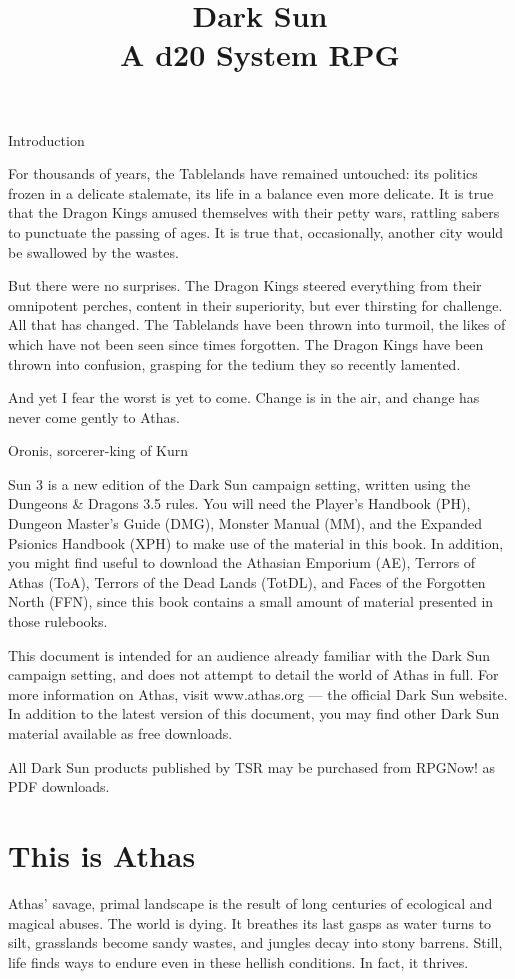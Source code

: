 \documentclass[10pt,a4paper,twocolumn]{d20}
\title{Dark Sun\\
  \large A d20 System RPG}
\begin{document}
\tableofcontents

\Chapter
{Introduction}
{For thousands of years, the Tablelands have remained untouched: its politics frozen in a delicate stalemate, its life in a balance even more delicate. It is true that the Dragon Kings amused themselves with their petty wars, rattling sabers to punctuate the passing of ages. It is true that, occasionally, another city would be swallowed by the wastes.

But there were no surprises. The Dragon Kings steered everything from their omnipotent perches, content in their superiority, but ever thirsting for challenge. All that has changed. The Tablelands have been thrown into turmoil, the likes of which have not been seen since times forgotten. The Dragon Kings have been thrown into confusion, grasping for the tedium they so recently lamented.

And yet I fear the worst is yet to come. Change is in the air, and change has never come gently to Athas.}
{Oronis, sorcerer-king of Kurn}
{}

 Sun 3 is a new edition of the Dark Sun campaign setting, written using the Dungeons \& Dragons 3.5 rules. You will need the Player’s Handbook (PH), Dungeon Master’s Guide (DMG), Monster Manual (MM), and the Expanded Psionics Handbook (XPH) to make use of the material in this book. In addition, you might find useful to download the Athasian Emporium (AE), Terrors of Athas (ToA), Terrors of the Dead Lands (TotDL), and Faces of the Forgotten North (FFN), since this book contains a small amount of material presented in those rulebooks.

This document is intended for an audience already familiar with the Dark Sun campaign setting, and does not attempt to detail the world of Athas in full. For more information on Athas, visit www.athas.org --- the official Dark Sun website. In addition to the latest version of this document, you may find other Dark Sun material available as free downloads.

All Dark Sun products published by TSR may be purchased from RPGNow! as PDF downloads.

\section{This is Athas}

Athas’ savage, primal landscape is the result of long centuries of ecological and magical abuses. The world is dying. It breathes its last gasps as water turns to silt, grasslands become sandy wastes, and jungles decay into stony barrens. Still, life finds ways to endure even in these hellish conditions. In fact, it thrives.
\end{document}
